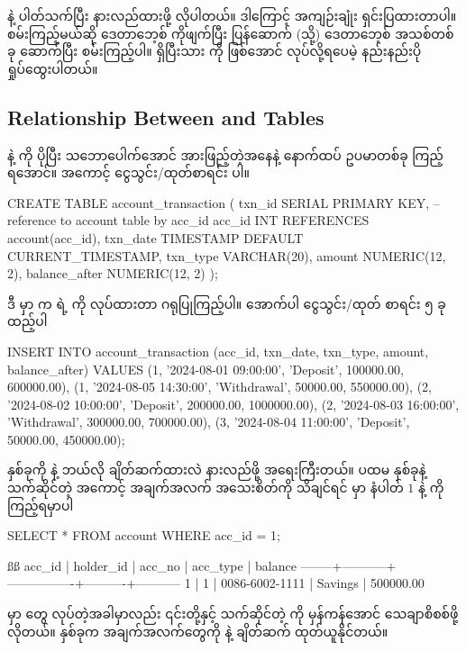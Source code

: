  နဲ့ ပါတ်သက်ပြီး နားလည်ထားဖို့ လိုပါတယ်။ ဒါကြောင့် အကျဉ်းချုံး ရှင်းပြထားတာပါ။  စမ်းကြည့်မယ်ဆို ဒေတာဘေ့စ် ကိုဖျက်ပြီး  ပြန်ဆောက် (သို့) ဒေတာဘေ့စ် အသစ်တစ်ခု ဆောက်ပြီး စမ်းကြည့်ပါ။ ရှိပြီးသား  ကို  ဖြစ်အောင် လုပ်လို့ရပေမဲ့ နည်းနည်းပိုရှုပ်ထွေးပါတယ်။

\subsection*{Relationship Between  and  Tables}
 နဲ့  ကို ပိုပြီး သဘောပေါက်အောင် အားဖြည့်တဲ့အနေနဲ့ နောက်ထပ် ဥပမာတစ်ခု ကြည့်ရအောင်။ အကောင့် ငွေသွင်း/ထုတ်စာရင်း   ပါ။
%
\begin{sql}
CREATE TABLE account_transaction (
    txn_id SERIAL PRIMARY KEY,
    -- reference to account table by acc_id
    acc_id INT REFERENCES account(acc_id),
    txn_date TIMESTAMP DEFAULT CURRENT_TIMESTAMP,
    txn_type VARCHAR(20),
    amount NUMERIC(12, 2),
    balance_after NUMERIC(12, 2)
);
\end{sql}
%
ဒီ  မှာ   က   ရဲ့   ကို  လုပ်ထားတာ ဂရုပြုကြည့်ပါ။ အောက်ပါ ငွေသွင်း/ထုတ် စာရင်း  ၅ ခု ထည့်ပါ 
%
\begin{sql}
INSERT INTO account_transaction 
    (acc_id, txn_date, txn_type, amount, balance_after)
VALUES 
    (1, '2024-08-01 09:00:00', 'Deposit', 100000.00, 600000.00),
    (1, '2024-08-05 14:30:00', 'Withdrawal', 50000.00, 550000.00),
    (2, '2024-08-02 10:00:00', 'Deposit', 200000.00, 1000000.00),
    (2, '2024-08-03 16:00:00', 'Withdrawal', 300000.00, 700000.00),
    (3, '2024-08-04 11:00:00', 'Deposit', 50000.00, 450000.00);
\end{sql}
%
 နှစ်ခုကို  နဲ့ ဘယ်လို ချိတ်ဆက်ထားလဲ နားလည်ဖို့ အရေးကြီးတယ်။ ပထမ  နှစ်ခုနဲ့ သက်ဆိုင်တဲ့ အကောင့် အချက်အလက် အသေးစိတ်ကို သိချင်ရင်   မှာ  နံပါတ် $1$ နဲ့  ကို ကြည့်ရမှာပါ
%
\begin{sql}
SELECT * FROM account WHERE acc_id = 1;
\end{sql}
%
%
\begin{vbtm}
ßß
 acc_id | holder_id |     acc_no     | acc_type |  balance
--------+-----------+----------------+----------+-----------
      1 |         1 | 0086-6002-1111 | Savings  | 500000.00
\end{vbtm}
%
  မှာ  တွေ   လုပ်တဲ့အခါမှာလည်း ၎င်းတို့နှင့် သက်ဆိုင်တဲ့  ကို မှန်ကန်အောင် သေချာစိစစ်ဖို့ လိုတယ်။  နှစ်ခုက အချက်အလက်တွေကို  နဲ့ ချိတ်ဆက် ထုတ်ယူနိုင်တယ်။


